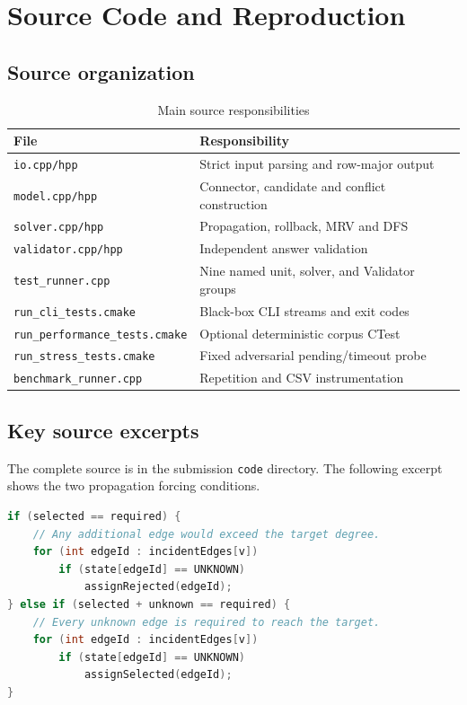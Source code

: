 \documentclass[11pt,a4paper,oneside]{article}
\begin{document}
\appendix
\section{Source Code and Reproduction}

\subsection{Source organization}

\begin{table}[H]
\centering
\caption{Main source responsibilities}
\begin{tabular}{ll}
\toprule
File & Responsibility \\
\midrule
\texttt{io.cpp/hpp} & Strict input parsing and row-major output \\
\texttt{model.cpp/hpp} & Connector, candidate and conflict construction \\
\texttt{solver.cpp/hpp} & Propagation, rollback, MRV and DFS \\
\texttt{validator.cpp/hpp} & Independent answer validation \\
\texttt{test\_runner.cpp} & Nine named unit, solver, and Validator groups \\
\texttt{run\_cli\_tests.cmake} & Black-box CLI streams and exit codes \\
\texttt{run\_performance\_tests.cmake} & Optional deterministic corpus CTest \\
\texttt{run\_stress\_tests.cmake} & Fixed adversarial pending/timeout probe \\
\texttt{benchmark\_runner.cpp} & Repetition and CSV instrumentation \\
\bottomrule
\end{tabular}
\end{table}

\subsection{Key source excerpts}

The complete source is in the submission \texttt{code} directory. The following
excerpt shows the two propagation forcing conditions.

\begin{lstlisting}[language=C++,caption={Forced propagation excerpt}]
if (selected == required) {
    // Any additional edge would exceed the target degree.
    for (int edgeId : incidentEdges[v])
        if (state[edgeId] == UNKNOWN)
            assignRejected(edgeId);
} else if (selected + unknown == required) {
    // Every unknown edge is required to reach the target.
    for (int edgeId : incidentEdges[v])
        if (state[edgeId] == UNKNOWN)
            assignSelected(edgeId);
}
\end{lstlisting}
\end{document}
